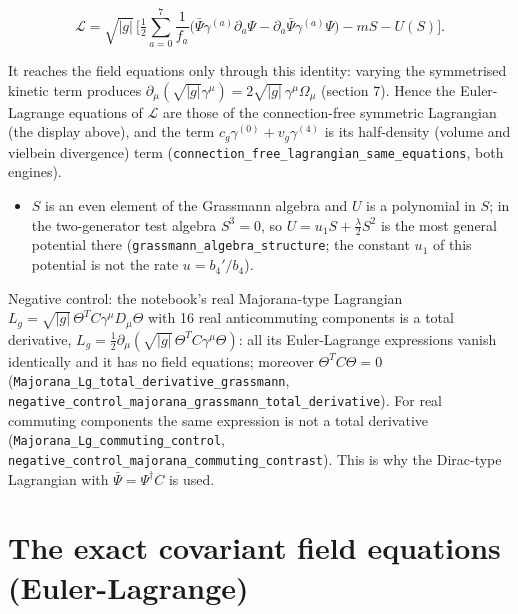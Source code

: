 \documentclass[11pt]{article}
\begin{document}
\[
\mathcal{L} = \sqrt{|g|}\,\Big[\tfrac12\sum_{a=0}^{7}\frac{1}{f_a}\big(\bar\Psi\gamma^{(a)}\partial_a\Psi - \partial_a\bar\Psi\gamma^{(a)}\Psi\big) - mS - U(S)\Big].
\]

It reaches the field equations only through this identity: varying the symmetrised kinetic term produces $\partial_\mu(\sqrt{|g|}\gamma^\mu) = 2\sqrt{|g|}\,\gamma^\mu\Omega_\mu$ (section 7). Hence the Euler-Lagrange equations of $\mathcal{L}$ are those of the connection-free symmetric Lagrangian (the display above), and the term $c_g\gamma^{(0)} + v_g\gamma^{(4)}$ is its half-density (volume and vielbein divergence) term (\texttt{connecti\allowbreak{}on\_free\_\allowbreak{}lagrangi\allowbreak{}an\_same\_\allowbreak{}equation\allowbreak{}s}, both engines).

\begin{itemize}
\item $S$ is an even element of the Grassmann algebra and $U$ is a polynomial in $S$; in the two-generator test algebra $S^3 = 0$, so $U = u_1 S + \frac{\lambda}{2}S^2$ is the most general potential there (\texttt{grassman\allowbreak{}n\_algebr\allowbreak{}a\_struct\allowbreak{}ure}; the constant $u_1$ of this potential is not the rate $u = b_4'/b_4$).
\end{itemize}

Negative control: the notebook's real Majorana-type Lagrangian $L_g = \sqrt{|g|}\,\Theta^T C\gamma^\mu D_\mu\Theta$ with 16 real anticommuting components is a total derivative, $L_g = \frac12\partial_\mu(\sqrt{|g|}\,\Theta^T C\gamma^\mu\Theta)$: all its Euler-Lagrange expressions vanish identically and it has no field equations; moreover $\Theta^T C\Theta = 0$ (\texttt{Majorana\allowbreak{}\_Lg\_tota\allowbreak{}l\_deriva\allowbreak{}tive\_gra\allowbreak{}ssmann}, \texttt{negative\allowbreak{}\_control\allowbreak{}\_majoran\allowbreak{}a\_grassm\allowbreak{}ann\_tota\allowbreak{}l\_deriva\allowbreak{}tive}). For real commuting components the same expression is not a total derivative (\texttt{Majorana\allowbreak{}\_Lg\_comm\allowbreak{}uting\_co\allowbreak{}ntrol}, \texttt{negative\allowbreak{}\_control\allowbreak{}\_majoran\allowbreak{}a\_commut\allowbreak{}ing\_cont\allowbreak{}rast}). This is why the Dirac-type Lagrangian with $\bar\Psi = \Psi^\dagger C$ is used.

\section{The exact covariant field equations (Euler-Lagrange)}
\end{document}
